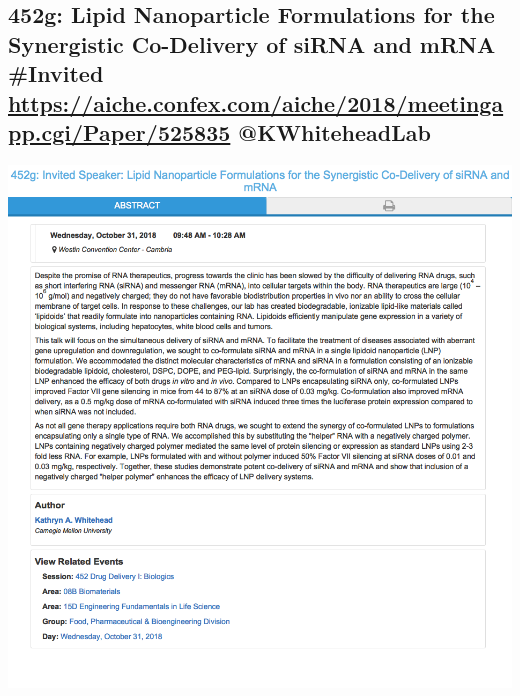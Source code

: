 \documentclass[11pt]{article}
\begin{document}
\subsection{452g: Lipid Nanoparticle Formulations for the Synergistic Co-Delivery of siRNA and mRNA \#Invited \url{https://aiche.confex.com/aiche/2018/meetingapp.cgi/Paper/525835} @KWhiteheadLab}
\label{sec:orgd08a5c5}
\begin{center}
\includegraphics[width=.9\linewidth]{./525835.png}
\end{center}
\end{document}
